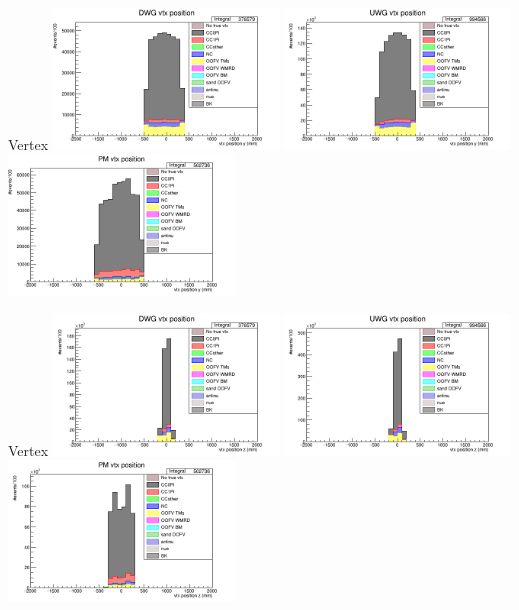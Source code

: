 \documentclass{beamer}
\begin{document}
\begin{frame}{Vertex}
    \includegraphics[width=0.45\textwidth]{images/vtx_reco_pos[1]_wgbm_topo_DWG_accum_level[][26]_data_mc.png}
    \includegraphics[width=0.45\textwidth]{images/vtx_reco_pos[1]_wgbm_topo_UWG_accum_level[][16]_data_mc.png}
    \includegraphics[width=0.45\textwidth]{images/vtx_reco_pos[1]_wgbm_topo_PM_accum_level[][06]_data_mc.png}
\end{frame}

\begin{frame}{Vertex}
    \includegraphics[width=0.45\textwidth]{images/vtx_reco_pos[2]_wgbm_topo_DWG_accum_level[][26]_data_mc.png}
    \includegraphics[width=0.45\textwidth]{images/vtx_reco_pos[2]_wgbm_topo_UWG_accum_level[][16]_data_mc.png}
    \includegraphics[width=0.45\textwidth]{images/vtx_reco_pos[2]_wgbm_topo_PM_accum_level[][06]_data_mc.png}
\end{frame}
\end{document}
